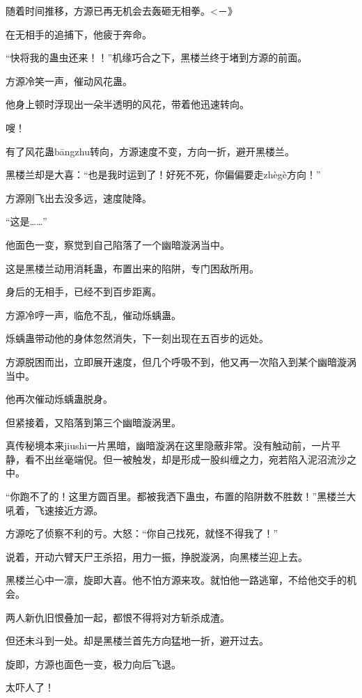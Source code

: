 
\begin{this_body}

随着时间推移，方源已再无机会去轰砸无相拳。<－》

在无相手的追捕下，他疲于奔命。

“快将我的蛊虫还来！！”机缘巧合之下，黑楼兰终于堵到方源的前面。

方源冷笑一声，催动风花蛊。

他身上顿时浮现出一朵半透明的风花，带着他迅速转向。

嗖！

有了风花蛊bāngzhu转向，方源速度不变，方向一折，避开黑楼兰。

黑楼兰却是大喜：“也是我时运到了！好死不死，你偏偏要走zhègè方向！”

方源刚飞出去没多远，速度陡降。

“这是……”

他面色一变，察觉到自己陷落了一个幽暗漩涡当中。

这是黑楼兰动用消耗蛊，布置出来的陷阱，专门困敌所用。

身后的无相手，已经不到百步距离。

方源冷哼一声，临危不乱，催动烁蝺蛊。

烁蝺蛊带动他的身体忽然消失，下一刻出现在五百步的远处。

方源脱困而出，立即展开速度，但几个呼吸不到，他又再一次陷入到某个幽暗漩涡当中。

他再次催动烁蝺蛊脱身。

但紧接着，又陷落到第三个幽暗漩涡里。

真传秘境本来jiushi一片黑暗，幽暗漩涡在这里隐蔽非常。没有触动前，一片平静，看不出丝毫端倪。但一被触发，却是形成一股纠缠之力，宛若陷入泥沼流沙之中。

“你跑不了的！这里方圆百里。都被我洒下蛊虫，布置的陷阱数不胜数！”黑楼兰大吼着，飞速接近方源。

方源吃了侦察不利的亏。大怒：“你自己找死，就怪不得我了！”

说着，开动六臂天尸王杀招，用力一振，挣脱漩涡，向黑楼兰迎上去。

黑楼兰心中一凛，旋即大喜。他不怕方源来攻。就怕他一路逃窜，不给他交手的机会。

两人新仇旧恨叠加一起，都恨不得将对方斩杀成渣。

但还未斗到一处。却是黑楼兰首先方向猛地一折，避开过去。

旋即，方源也面色一变，极力向后飞退。

太吓人了！


\end{this_body}
